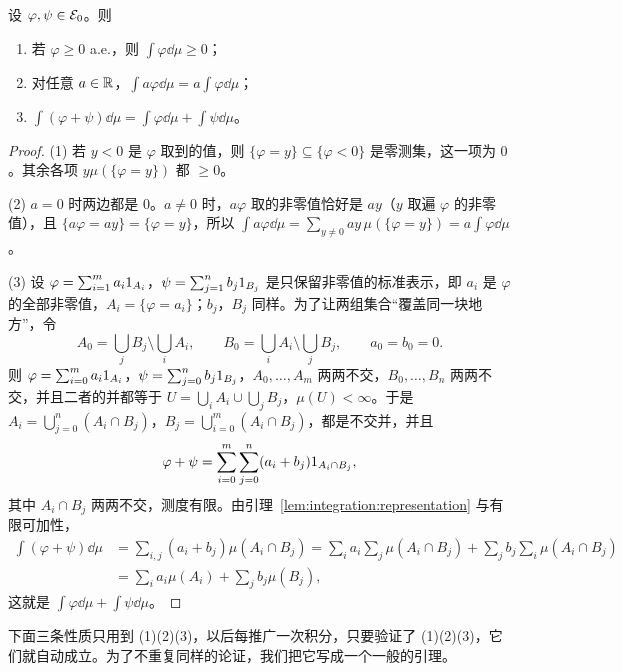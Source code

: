 \begin{proposition}\label{prop:integration:simple}
设 $\varphi,\psi\in\mathcal{E}_0$。则
\begin{enumerate}
\item 若 $\varphi\geqslant0$ a.e.，则 $\int\varphi\dd\mu\geqslant0$；
\item 对任意 $a\in\mathbb{R}$，$\int a\varphi\dd\mu=a\int\varphi\dd\mu$；
\item $\int(\varphi+\psi)\dd\mu=\int\varphi\dd\mu+\int\psi\dd\mu$。
\end{enumerate}
\end{proposition}
\begin{proof}
(1) 若 $y<0$ 是 $\varphi$ 取到的值，则 $\{\varphi=y\}\subseteq\{\varphi<0\}$ 是零测集，这一项为 $0$。其余各项 $y\mu(\{\varphi=y\})$ 都 $\geqslant0$。

(2) $a=0$ 时两边都是 $0$。$a\neq0$ 时，$a\varphi$ 取的非零值恰好是 $ay$（$y$ 取遍 $\varphi$ 的非零值），且 $\{a\varphi=ay\}=\{\varphi=y\}$，所以 $\int a\varphi\dd\mu=\sum_{y\neq0}ay\,\mu(\{\varphi=y\})=a\int\varphi\dd\mu$。

(3) 设 $\varphi=\sum_{i=1}^ma_i1_{A_i}$，$\psi=\sum_{j=1}^nb_j1_{B_j}$ 是只保留非零值的标准表示，即 $a_i$ 是 $\varphi$ 的全部非零值，$A_i=\{\varphi=a_i\}$；$b_j$，$B_j$ 同样。为了让两组集合“覆盖同一块地方”，令
\[
A_0=\bigcup_jB_j\setminus\bigcup_iA_i,\qquad B_0=\bigcup_iA_i\setminus\bigcup_jB_j,\qquad a_0=b_0=0.
\]
则 $\varphi=\sum_{i=0}^ma_i1_{A_i}$，$\psi=\sum_{j=0}^nb_j1_{B_j}$，$A_0,\dots,A_m$ 两两不交，$B_0,\dots,B_n$ 两两不交，并且二者的并都等于 $U=\bigcup_iA_i\cup\bigcup_jB_j$，$\mu(U)<\infty$。于是 $A_i=\bigcup_{j=0}^n(A_i\cap B_j)$，$B_j=\bigcup_{i=0}^m(A_i\cap B_j)$，都是不交并，并且
\[
\varphi+\psi=\sum_{i=0}^m\sum_{j=0}^n(a_i+b_j)1_{A_i\cap B_j},
\]
其中 $A_i\cap B_j$ 两两不交，测度有限。由引理~\ref{lem:integration:representation} 与有限可加性，
\[
\begin{aligned}
\int(\varphi+\psi)\dd\mu&=\sum_{i,j}(a_i+b_j)\mu(A_i\cap B_j)=\sum_ia_i\sum_j\mu(A_i\cap B_j)+\sum_jb_j\sum_i\mu(A_i\cap B_j)\\
&=\sum_ia_i\mu(A_i)+\sum_jb_j\mu(B_j),
\end{aligned}
\]
这就是 $\int\varphi\dd\mu+\int\psi\dd\mu$。
\end{proof}

下面三条性质只用到 (1)(2)(3)，以后每推广一次积分，只要验证了 (1)(2)(3)，它们就自动成立。为了不重复同样的论证，我们把它写成一个一般的引理。

